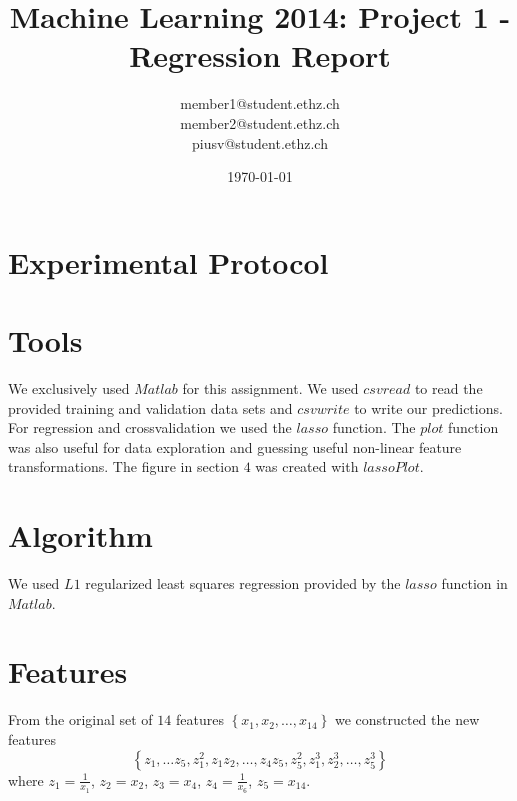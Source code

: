 \documentclass[a4paper, 11pt]{article}
\title{Machine Learning 2014: Project 1 - Regression Report}
\author{member1@student.ethz.ch\\ member2@student.ethz.ch\\ piusv@student.ethz.ch\\}
\date{\today}
\begin{document}
\maketitle

\section*{Experimental Protocol}

\section{Tools}

We exclusively used $Matlab$ for this assignment.
We used $csvread$ to read the provided training and validation data sets and
$csvwrite$ to write our predictions. For regression and crossvalidation we used
the $lasso$ function. The $plot$ function was also useful for data exploration
and guessing useful non-linear feature transformations. The figure in section $4$
was created with $lassoPlot$.


\section{Algorithm}
We used $L1$ regularized least squares regression provided by the $lasso$ function in $Matlab$.

\section{Features}

From the original set of $14$ features $\left\{x_1, x_2, \ldots, x_{14} \right\}$
we constructed the new features
\[
\left\{z_1, \ldots z_5, z_{1}^{2}, z_1z_2, \ldots, z_4z_5, z_{5}^{2}, z_{1}^{3}, z_{2}^{3}, \ldots, z_{5}^{3} \right\}
\]
where $z_1 = \frac{1}{x_1}$, $z_2 = x_2$, $z_3 = x_4$, $z_4 = \frac{1}{x_6}$, $z_5 = x_{14}$.
\end{document}
